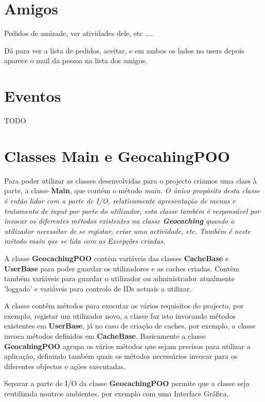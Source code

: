 \documentclass{article}
\begin{document}
\section{Amigos}
Pedidos de amizade, ver atividades dele, etc ....

Dá para ver a lista de pedidos, aceitar, e em ambos os lados no users depois aparece o mail da pessoa na lista dos amigos.





\pagebreak
\section{Eventos}
TODO










\pagebreak
\section{Classes Main e GeocahingPOO}
\par Para poder utilizar as classes desenvolvidas para o projecto criamos uma class à parte, a classe \textbf{Main}, que contém 
o método \em main. O único propósito desta classe é então lidar com a parte de I/O, relativamente apresentação de menus 
e tratamento de input por parte do utilizador, esta classe também é responsável por invocar os diferentes métodos existentes 
na classe \textbf{Geocaching} quando o utilizador necessitar de se registar, criar uma actividade, etc.
Também é neste método \em main que se lida com as Excepções criadas.
\par A classe \textbf{GeocachingPOO} contém variáveis das classes \textbf{CacheBase} e \textbf{UserBase} para poder guardar 
os utilizadores e as caches criadas. Contêm também variáveis para guardar o utilizador ou administrador atualmente 'loggado' 
e variáveis para controlo de IDs actuais a utilizar.
\par A classe contêm métodos para executar os vários requisitos do projecto, por exemplo, registar um utilizador novo, a classe 
faz isto invocando métodos existentes em \textbf{UserBase}, já no caso de criação de caches, por exemplo, a classe invoca 
métodos definidos em \textbf{CacheBase}. Basicamente a classe \textbf{GeocahingPOO} agrupa os vários métodos que sejam 
precisos para utilizar a aplicação, definindo também quais os métodos necessários invocar para os diferentes objectos e ações 
executadas.
\par Separar a parte de I/O da classe \textbf{GeocachingPOO} permite que a classe seja reutilizada noutros ambientes, por 
exemplo com uma Interface Gráfica.
\end{document}

